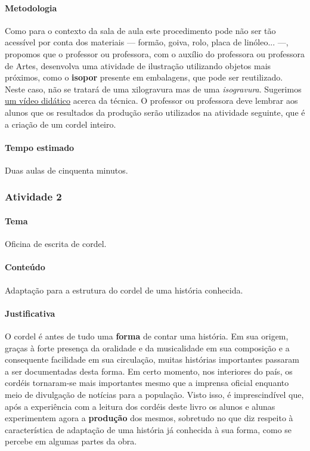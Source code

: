 \documentclass[11pt]{extarticle}
\begin{document}

\paragraph{Metodologia} Como para o contexto da sala de aula este procedimento pode não ser tão
acessível por conta dos materiais --- formão, goiva, rolo, placa de linóleo... ---,
propomos que o professor ou professora, com o auxílio do professora ou professora
de Artes, desenvolva uma atividade de ilustração utilizando objetos mais 
próximos, como o \textbf{isopor} presente em embalagens, que pode ser reutilizado.
Neste caso, não se tratará de uma xilogravura mas de uma \textit{isogravura}.
Sugerimos \href{https://www.youtube.com/watch?v=8sq9Qq-wrls}{um vídeo didático}
acerca da técnica. O professor ou
professora deve lembrar aos alunos que os resultados da produção serão utilizados
na atividade seguinte, que é a criação de um cordel inteiro. 

\paragraph{Tempo estimado} Duas aulas de cinquenta minutos.

\subsubsection{Atividade 2}


\paragraph{Tema} Oficina de escrita de cordel.


\paragraph{Conteúdo} Adaptação para a estrutura do cordel
de uma história conhecida.

\paragraph{Justificativa} O cordel é antes de tudo uma \textbf{forma} 
de contar uma história. Em sua origem, graças à forte presença
da oralidade e da musicalidade em sua composição e a consequente
facilidade em sua circulação, muitas histórias importantes passaram
a ser documentadas desta forma. Em certo momento, nos interiores 
do país, os cordéis tornaram-se mais importantes mesmo que a imprensa
oficial enquanto meio de divulgação de notícias para a população. 
Visto isso, é imprescindível que, após a experiência com a leitura dos
cordéis deste livro os alunos e alunas experimentem agora a \textbf{produção}
dos mesmos, sobretudo no que diz respeito à característica de adaptação 
de uma história já conhecida à sua forma, como se percebe em algumas
partes da obra.
\end{document}
